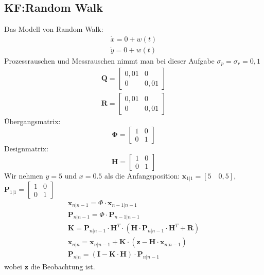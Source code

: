\subsection{KF:Random Walk}
Das Modell von Random Walk:
\begin{gather*}
	\dot{x} = 0 + w(t) \\
	\dot{y} = 0 + w(t)
\end{gather*}
Prozessrauschen und Messrauschen nimmt man bei dieser Aufgabe $\sigma_p = \sigma_r = 0,1$
\begin{gather*}
	\bm{Q} = \begin{bmatrix}
	0,01 & 0 \\
	0 & 0,01
	\end{bmatrix} \\
	\bm{R} = \begin{bmatrix}
	0,01 & 0 \\
	0 & 0,01
	\end{bmatrix}
\end{gather*}
Übergangsmatrix:
\begin{equation*}
	\bm{\Phi} = \begin{bmatrix}
	1 & 0 \\
	0 & 1
	\end{bmatrix}
\end{equation*}
Designmatrix:
\begin{equation*}
	\bm{H} = \begin{bmatrix}
	1 & 0 \\
	0 & 1
	\end{bmatrix}
\end{equation*}
Wir nehmen $y = 5$ und $x = 0.5$ als die Anfangsposition: $\bm{x}_{1|1} = \left[5 \quad  0,5\right]$, $\bm{P}_{1|1} = \begin{bmatrix}
1 & 0 \\
0 & 1
\end{bmatrix}$
\begin{gather*}
	\bm{x}_{n|n-1} = \Phi \cdot \bm{x}_{n-1|n-1} \\
	\bm{P}_{n|n-1} = \Phi \cdot \bm{P}_{n-1|n-1} \\
	\bm{K} = \bm{P}_{n|n-1} \cdot \bm{H}^T \cdot \left(\bm{H} \cdot \bm{P}_{n|n-1} \cdot \bm{H}^T + \bm{R} \right) \\
	\bm{x}_{n|n} = \bm{x}_{n|n-1} + \bm{K} \cdot \left(\bm{z} - \bm{H} \cdot \bm{x}_{n|n-1} \right) \\
	\bm{P}_{n|n} = \left(\bm{I} - \bm{K} \cdot \bm{H}\right) \cdot \bm{P}_{n|n-1}
\end{gather*}
wobei $\bm{z}$ die Beobachtung ist.
